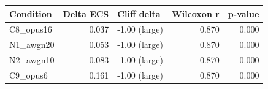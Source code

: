 \begin{tabular}{lrlrr}
\toprule
Condition & Delta ECS & Cliff delta & Wilcoxon r & p-value \\
\midrule
C8_opus16 & 0.037 & -1.00 (large) & 0.870 & 0.000 \\
N1_awgn20 & 0.053 & -1.00 (large) & 0.870 & 0.000 \\
N2_awgn10 & 0.083 & -1.00 (large) & 0.870 & 0.000 \\
C9_opus6 & 0.161 & -1.00 (large) & 0.870 & 0.000 \\
\bottomrule
\end{tabular}
